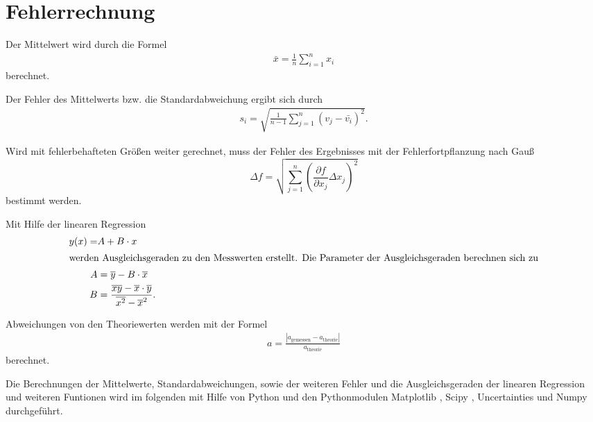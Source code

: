 \section{Fehlerrechnung}
\label{sec:Fehlerrechnung}

Der Mittelwert wird durch die Formel
\begin{align*}
    \bar{x}=\frac{1}{n} \sum_{i=1}^n x_i \label{eqn:Mittelwert}
\end{align*}
berechnet.

Der Fehler des Mittelwerts bzw. die Standardabweichung ergibt sich durch
\begin{align*}
    s_i=\sqrt{\frac{1}{n-1}\sum_{j=1}^n (v_j-\bar{v_i})^2}.
\end{align*}

Wird mit fehlerbehafteten Größen weiter gerechnet, muss der Fehler des Ergebnisses mit der Fehlerfortpflanzung nach Gauß
\begin{equation*}
    \Delta f=\sqrt{\sum_{j=1}^n \left(\frac{\partial f}{\partial x_j}\Delta x_j \right)^{2} }\label{eqn:Gauß}
\end{equation*}
bestimmt werden.

Mit Hilfe der linearen Regression 
\begin{align*}
    y(x)=&A+B\cdot x\\\label{eqn:lin}
    \intertext{werden Ausgleichsgeraden zu den Messwerten erstellt. Die Parameter der Ausgleichsgeraden berechnen sich zu}
    A&=\overline{y}-B\cdot \overline{x}\\
    B&=\frac{\overline{xy}-\overline{x}\cdot \overline{y}}{\overline{x^2}-\overline{x}^2}.
\end{align*}

Abweichungen von den Theoriewerten werden mit der Formel
\begin{align}
  a=\frac{|a_\mathrm{gemessen}-a_\mathrm{theorie}|}{a_\mathrm{theorie}} \label{eqn:abweich}
\end{align}
berechnet.

Die Berechnungen der Mittelwerte, Standardabweichungen, sowie der weiteren Fehler und die Ausgleichsgeraden der linearen Regression und weiteren Funtionen
wird im folgenden mit Hilfe von Python \cite{python} und den Pythonmodulen Matplotlib \cite{matplotlib}, Scipy \cite{scipy}, Uncertainties \cite{unceratainties} und Numpy \cite{numpy}
durchgeführt.